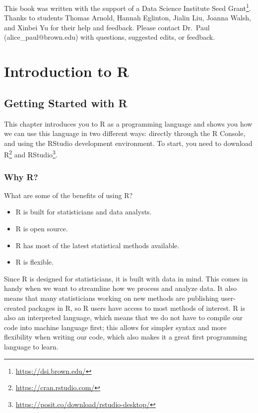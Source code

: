 \documentclass[
  letterpaper,
]{latex/krantz}
\providecommand{\tightlist}{%
  \setlength{\itemsep}{0pt}\setlength{\parskip}{0pt}}\usepackage{longtable,booktabs,array}
\renewcommand{\href}[2]{#2\footnote{\url{#1}}}
\begin{document}

This book was written with the support of a
\href{https://dsi.brown.edu/}{Data Science Institute Seed Grant}. Thanks
to students Thomas Arnold, Hannah Eglinton, Jialin Liu, Joanna Walsh,
and Xinbei Yu for their help and feedback. Please contact Dr.~Paul
(alice\_paul@brown.edu) with questions, suggested edits, or feedback.

\mainmatter

\part{Introduction to R}

\chapter{Getting Started with R}\label{sec-intro-to-r}

This chapter introduces you to R as a programming language and shows you
how we can use this language in two different ways: directly through the
R Console, and using the RStudio development environment. To start, you
need to download \href{https://cran.rstudio.com/}{R} and
\href{https://posit.co/download/rstudio-desktop/}{RStudio}.

\section{Why R?}\label{why-r}

What are some of the benefits of using R?

\begin{itemize}
\tightlist
\item
  R is built for statisticians and data analysts.\\
\item
  R is open source.\\
\item
  R has most of the latest statistical methods available.\\
\item
  R is flexible.
\end{itemize}

Since R is designed for statisticians, it is built with data in mind.
This comes in handy when we want to streamline how we process and
analyze data. It also means that many statisticians working on new
methods are publishing user-created packages in R, so R users have
access to most methods of interest. R is also an interpreted language,
which means that we do not have to compile our code into machine
language first; this allows for simpler syntax and more flexibility when
writing our code, which also makes it a great first programming language
to learn.
\end{document}
